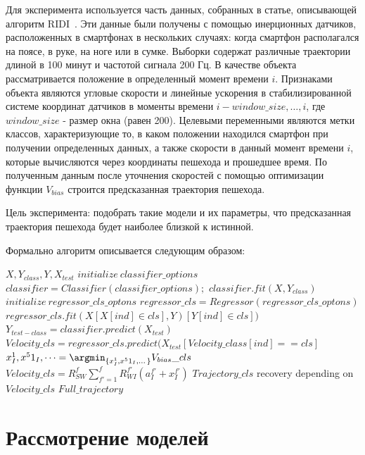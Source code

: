 \documentclass[12pt,twoside]{article}
\begin{document}
Для эксперимента используется часть данных, собранных в статье, описывающей алгоритм RIDI~\cite{journals/corr/abs-1712-09004}. Эти данные были получены с помощью инерционных датчиков, расположенных в смартфонах в нескольких случаях: когда смартфон располагался на поясе, в руке, на ноге или в сумке. Выборки содержат различные траектории длиной в 100 минут и частотой сигнала 200 Гц. В качестве объекта рассматривается положение в определенный момент времени $i$. Признаками объекта являются угловые скорости и линейные ускорения в стабилизированной системе координат датчиков в моменты времени $i-window\_size, \dots, i$, где $window\_size$ - размер окна (равен 200). Целевыми переменными являются метки классов, характеризующие то, в каком положении находился смартфон при получении определенных данных, а также скорости в данный момент времени $i$, которые вычисляются через координаты пешехода и прошедшее время. По полученным данным после уточнения скоростей с помощью оптимизации функции  $V_{bias}$ строится предсказанная траектория пешехода.

Цель эксперимента: подобрать такие модели и их параметры, что предсказанная траектория пешехода будет наиболее близкой к истинной.


Формально алгоритм описывается следующим образом: 

\begin{algorithmic}[1]
    \REQUIRE $X, Y_{class}, Y, X_{test}$
    \STATE $initialize ~ classifier\_options$
    \STATE $classifier = Classifier(classifier\_options);$
    \STATE $classifier.fit(X, Y_{class})$
    \STATE $initialize ~ regressor\_cls\_optons$
    \STATE $regressor\_cls = Regressor(regressor\_cls\_optons)$
    \STATE $regressor\_cls.fit(X[X[ind] \in cls], Y)[Y[ind] \in cls])$
    \ENDFOR
    \STATE $Y_{test-class} = classifier.predict(X_{test})$
    \STATE $Velocity\_cls = regressor\_cls.predict(X_{test}
    [Velocity\_class[ind] == cls]$
    \STATE $x^1_I, x^51_I,\dots = \argmin_{\{x^1_I, x^51_I,\dots\}}V_{bias}\_cls$
    \STATE $Velocity\_cls = R_{SW}^f\sum_{f'=1}^f R_{WI}^{f'}(a_I^{f'}+x_I^{f'})$
    \STATE $Trajectory\_cls$ recovery depending on $Velocity\_cls$
    \ENDFOR
    \RETURN $Full\_trajectory$
\end{algorithmic}

\section{Рассмотрение моделей}
\end{document}

